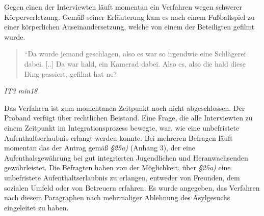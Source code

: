 Gegen einen der Interviewten läuft momentan ein Verfahren wegen schwerer Körperverletzung. Gemäß seiner Erläuterung kam es nach einem Fußballspiel zu einer körperlichen Auseinandersetzung, welche von einem der Beteiligten gefilmt wurde. 
\begin{quote}
    ``Da wurde jemand geschlagen, also es war so irgendwie eine Schlägerei dabei. [..] Da war hald, ein Kamerad dabei. Also es, also die hald diese Ding passiert, gefilmt hat ne?
\end{quote}
\centerline{\textit{IT3  min18}}
Das Verfahren ist zum momentanen Zeitpunkt noch nicht abgeschlossen. Der Proband verfügt über rechtlichen Beistand.
%
Eine Frage, die alle Interviewten zu einem Zeitpunkt im Integrationsprozess bewegte, war, wie eine unbefristete Aufenthaltserlaubnis erlangt werden konnte. Bei mehreren Befragen läuft momentan das der Antrag gemäß \textit{§25a)} (Anhang 3), der eine Aufenthalsgewährung bei gut integrierten Jugendlichen und Heranwachsenden gewährleistet.\newline
Die Befragten haben von der Möglichkeit, über \textit{§25a)} eine unbefristete Aufenthaltserlaubnis zu erlangen,  entweder von Freunden, dem sozialen Umfeld oder von Betreuern erfahren. Es wurde angegeben, das Verfahren nach diesem Paragraphen nach mehrmaliger Ablehnung des Asylgesuchs eingeleitet zu haben.